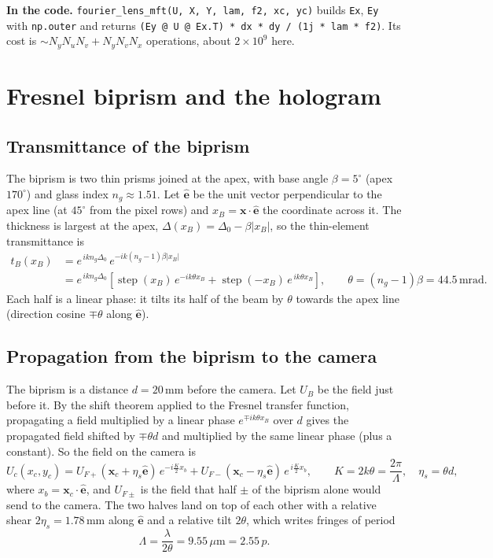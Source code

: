 \documentclass[11pt,a4paper]{article}
\newcommand{\ve}{\hat{\mathbf{e}}}
\newcommand{\um}{\,\mu\mathrm{m}}
\newcommand{\mm}{\,\mathrm{mm}}
\newcommand{\ee}{e}
\newcommand{\step}{\operatorname{step}}
\newcommand{\code}[1]{\texttt{\small #1}}
\newcommand{\incode}[1]{\par\smallskip\noindent\colorbox{black!6}{\parbox{\dimexpr\linewidth-2\fboxsep}{\small\textbf{In the code.} #1}}\par\smallskip}
\begin{document}
\incode{\code{fourier\_lens\_mft(U, X, Y, lam, f2, xc, yc)} builds
\code{Ex}, \code{Ey} with \code{np.outer} and returns
\code{(Ey @ U @ Ex.T) * dx * dy / (1j * lam * f2)}. Its cost is
$\sim N_yN_u N_v + N_yN_vN_x$ operations, about $2\times10^9$ here.}

\section{Fresnel biprism and the hologram}
\label{sec:biprism}

\subsection{Transmittance of the biprism}

The biprism is two thin prisms joined at the apex, with base angle
$\beta = 5^\circ$ (apex $170^\circ$) and glass index $n_g \approx 1.51$. Let
$\ve$ be the unit vector perpendicular to the apex line (at $45^\circ$ from
the pixel rows) and $x_B = \mathbf{x}\cdot\ve$ the coordinate across it. The
thickness is largest at the apex, $\Delta(x_B) = \Delta_0 - \beta|x_B|$, so
the thin-element transmittance is
\begin{align}
  t_B(x_B) &= \ee^{\,ikn_g\Delta_0}\,\ee^{-ik(n_g-1)\beta|x_B|}
  \nonumber\\
  &= \ee^{\,ikn_g\Delta_0}\left[\step(x_B)\,\ee^{-ik\theta x_B}
    + \step(-x_B)\,\ee^{\,ik\theta x_B}\right],
  \qquad \theta = (n_g-1)\beta = 44.5\,\mathrm{mrad}.
  \label{eq:tB}
\end{align}
Each half is a linear phase: it tilts its half of the beam by $\theta$
towards the apex line (direction cosine $\mp\theta$ along $\ve$).

\subsection{Propagation from the biprism to the camera}

The biprism is a distance $d = 20\mm$ before the camera. Let $U_B$ be the
field just before it. By the shift theorem applied to the Fresnel transfer
function, propagating a field multiplied by a linear phase
$\ee^{\mp ik\theta x_B}$ over $d$ gives the propagated field shifted by
$\mp\theta d$ and multiplied by the same linear phase (plus a constant). So
the field on the camera is
\begin{equation}
  U_c(x_c,y_c) = U_{F+}(\mathbf{x}_c+\eta_s\ve)\,\ee^{-i\frac{K}{2}x_b}
               + U_{F-}(\mathbf{x}_c-\eta_s\ve)\,\ee^{\,i\frac{K}{2}x_b},
  \qquad K = 2k\theta = \frac{2\pi}{\Lambda},\quad \eta_s = \theta d,
  \label{eq:Uc}
\end{equation}
where $x_b = \mathbf{x}_c\cdot\ve$, and $U_{F\pm}$ is the field that half
$\pm$ of the biprism alone would send to the camera. The two halves land on
top of each other with a relative shear $2\eta_s = 1.78\mm$ along $\ve$ and a
relative tilt $2\theta$, which writes fringes of period
\begin{equation}
  \Lambda = \frac{\lambda}{2\theta} = 9.55\um = 2.55\,p .
\end{equation}
\end{document}
